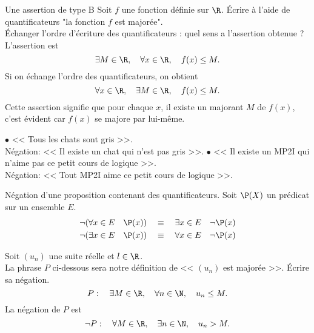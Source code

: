 \documentclass[11pt]{article}
\begin{document}
\begin{ex}{Une assertion de type B}{}
    Soit $f$ une fonction définie sur $\R$. Écrire à l'aide de quantificateurs "la fonction $f$ est majorée".\\
    Échanger l'ordre d'écriture des quantificateurs : quel sens a l'assertion obtenue ?
    \tcblower
    L'assertion est
    \begin{equation*}
        \exists M \in \R, \quad \forall x \in \R, \quad f(x) \leq M.
    \end{equation*}
    Si on échange l'ordre des quantificateurs, on obtient
    \begin{equation*}
        \forall x \in \R, \quad \exists M \in \R, \quad f(x) \leq M.
    \end{equation*}
    Cette assertion signifie que pour chaque $x$, il existe un majorant $M$ de $f(x)$, c'est évident car $f(x)$ se majore par lui-même.
\end{ex}

\noindent$\bullet$ << Tous les chats sont gris >>.\\
Négation: << Il existe un chat qui n'est pas gris >>.\n
$\bullet$ << Il existe un MP2I qui n'aime pas ce petit cours de logique >>.\\
Négation: << Tout MP2I aime ce petit cours de logique >>.
\vspace{0.3cm}

\begin{thm}{Négation d'une proposition contenant des quantificateurs.}{}
    Soit $\P(X)$ un prédicat sur un ensemble $E$.
    \begin{equation*}
        \begin{aligned}
            \lnot(\forall x \in E \quad \P(x)) \quad &\equiv \quad \exists x \in E \quad \lnot \P(x)\\
            \lnot(\exists x \in E \quad \P(x)) \quad &\equiv \quad \forall x \in E \quad \lnot \P(x)
        \end{aligned}
    \end{equation*}
\end{thm}

\begin{ex}{}{}
    Soit $(u_n)$ une suite réelle et $l\in\R$.\\
    La phrase $P$ ci-dessous sera notre définition de << $(u_n)$ est majorée >>. Écrire sa négation.
    \begin{equation*}
        P: \quad \exists M\in\R,\quad\forall n\in\N,\quad u_n\leq M.
    \end{equation*}
    \tcblower
    La négation de $P$ est
    \begin{equation*}
        \lnot P: \quad \forall M\in\R,\quad\exists n\in\N,\quad u_n> M.
    \end{equation*}
\end{ex}
\end{document}
